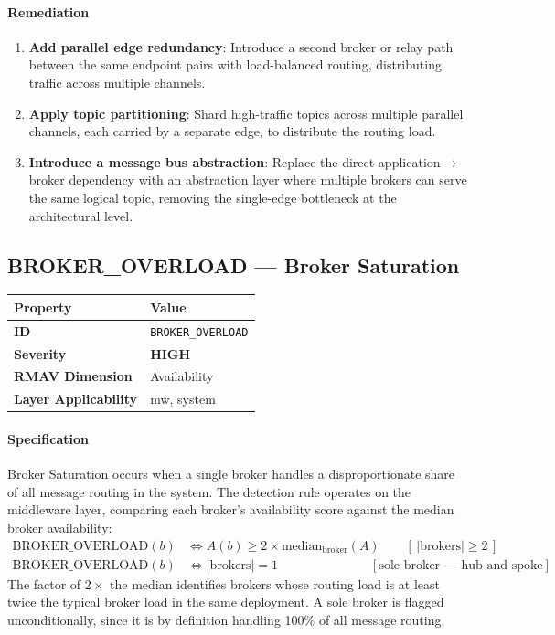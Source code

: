 \documentclass[11pt]{article}
\makeatletter
\newcommand{\HIGH}{\textcolor{orange!80!black}{\textbf{HIGH}}}
\newcommand{\patternprop}[4]{%
  \begin{center}
  \begin{tabular}{@{}ll@{}}
  \toprule
  \textbf{Property} & \textbf{Value} \\
  \midrule
  \textbf{ID} & \texttt{#1} \\
  \textbf{Severity} & #2 \\
  \textbf{RMAV Dimension} & #3 \\
  \textbf{Layer Applicability} & #4 \\
  \bottomrule
  \end{tabular}
  \end{center}
}
\makeatother
\begin{document}
\paragraph{Remediation}
\begin{enumerate}[leftmargin=*]
\item \textbf{Add parallel edge redundancy}: Introduce a second broker or relay path between the same endpoint pairs with load-balanced routing, distributing traffic across multiple channels.
\item \textbf{Apply topic partitioning}: Shard high-traffic topics across multiple parallel channels, each carried by a separate edge, to distribute the routing load.
\item \textbf{Introduce a message bus abstraction}: Replace the direct application$\to$broker dependency with an abstraction layer where multiple brokers can serve the same logical topic, removing the single-edge bottleneck at the architectural level.
\end{enumerate}

\subsection{BROKER\_OVERLOAD --- Broker Saturation}
\patternprop{BROKER\_OVERLOAD}{\HIGH}{Availability}{mw, system}

\paragraph{Specification}
Broker Saturation occurs when a single broker handles a disproportionate share of all message routing in the system. The detection rule operates on the middleware layer, comparing each broker's availability score against the median broker availability:
\begin{align*}
\mathrm{BROKER\_OVERLOAD}(b) &\Leftrightarrow A(b) \ge 2 \times \mathrm{median}_{\text{broker}}(A) \qquad [\,|\text{brokers}| \ge 2\,] \\
\mathrm{BROKER\_OVERLOAD}(b) &\Leftrightarrow |\text{brokers}| = 1 \qquad\qquad\qquad\quad\ [\text{sole broker --- hub-and-spoke}]
\end{align*}
The factor of $2\times$ the median identifies brokers whose routing load is at least twice the typical broker load in the same deployment. A sole broker is flagged unconditionally, since it is by definition handling 100\% of all message routing.
\end{document}
